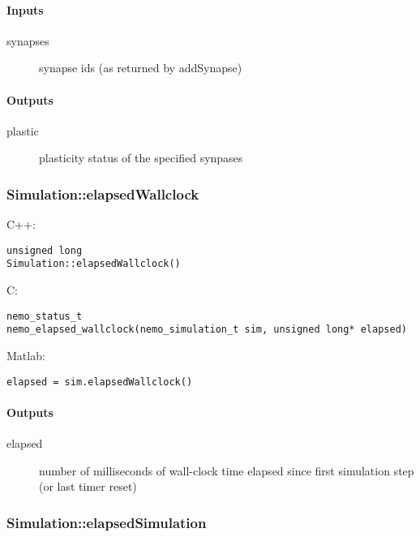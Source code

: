 \paragraph{Inputs}
\begin{description}
\item[synapses] synapse ids (as returned by addSynapse)
\end{description}
\paragraph{Outputs}
\begin{description}
\item[plastic] plasticity status of the specified synpases
\end{description}

\clearpage
\subsubsection*{Simulation::elapsedWallclock}
\label{fn: elapsedWallclock}



\noindent C++:
\begin{lstlisting}[aboveskip=2pt]
unsigned long
Simulation::elapsedWallclock()
\end{lstlisting}

\noindent C:
\begin{lstlisting}[aboveskip=2pt]
nemo_status_t
nemo_elapsed_wallclock(nemo_simulation_t sim, unsigned long* elapsed)
\end{lstlisting}

\noindent Matlab:
\begin{lstlisting}[aboveskip=2pt]
elapsed = sim.elapsedWallclock()
\end{lstlisting}
\paragraph{Outputs}
\begin{description}
\item[elapsed] number of milliseconds of wall-clock time elapsed since first simulation step (or last timer reset)
\end{description}

\clearpage
\subsubsection*{Simulation::elapsedSimulation}
\label{fn: elapsedSimulation}



